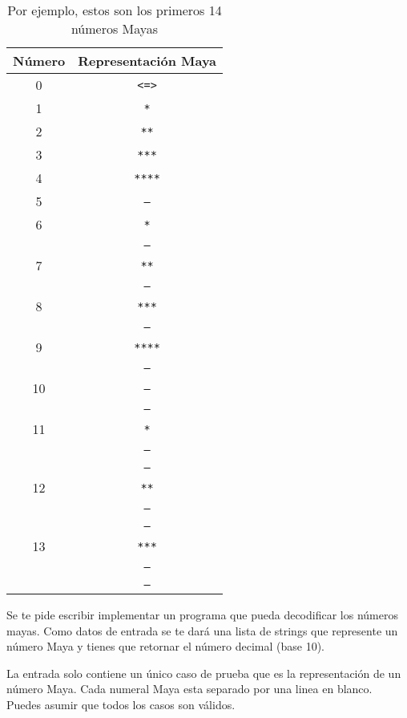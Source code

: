 \begin{table}[ht]
\centering
\begin{tabular}{|c|c|}
    \hline
    \textbf{Número} & \textbf{Representación Maya} \\
    \hline
    0 & \texttt{<=>} \\
    \hline
    1 & \texttt{*} \\
    \hline
    2 & \texttt{**} \\
    \hline
    3 & \texttt{***} \\
    \hline
    4 & \texttt{****} \\
    \hline
    5 & \texttt{---} \\
    \hline
    6 & \texttt{*} \\
      & \texttt{---} \\
    \hline
    7 & \texttt{**} \\
      & \texttt{---} \\
    \hline
    8 & \texttt{***} \\
      & \texttt{---} \\
    \hline
    9 & \texttt{****} \\
      & \texttt{---} \\
    \hline
    10 & \texttt{---} \\
       & \texttt{---} \\
    \hline
    11 & \texttt{*} \\
       & \texttt{---} \\
       & \texttt{---} \\
    \hline
    12 & \texttt{**} \\
       & \texttt{---} \\
       & \texttt{---} \\
    \hline
    13 & \texttt{***} \\
       & \texttt{---} \\
       & \texttt{---} \\
    \hline
\end{tabular}
\caption{Por ejemplo, estos son los primeros 14 n\'umeros Mayas}
\end{table}

Se te pide escribir implementar un programa que pueda decodificar los n\'umeros mayas. Como datos de entrada se te dar\'a una lista de strings que represente un n\'umero Maya y tienes que retornar el n\'umero decimal (base 10).


La entrada solo contiene un \'unico caso de prueba que es la representaci\'on de un n\'umero Maya. Cada numeral Maya esta separado por una linea en blanco. Puedes asumir que todos los casos son v\'alidos.

